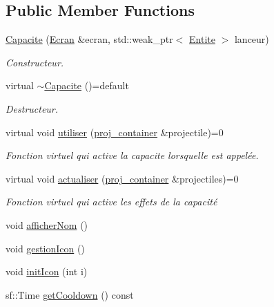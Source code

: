 \subsection*{Public Member Functions}
\begin{DoxyCompactItemize}
\item 
\mbox{\hyperlink{class_capacite_af1279c795ea1d1d157cf3cad846d374e}{Capacite}} (\mbox{\hyperlink{class_ecran}{Ecran}} \&ecran, std\+::weak\+\_\+ptr$<$ \mbox{\hyperlink{class_entite}{Entite}} $>$ lanceur)
\begin{DoxyCompactList}\small\item\em Constructeur. \end{DoxyCompactList}\item 
virtual \mbox{\hyperlink{class_capacite_a43be1570a24a64682ff3f034330779a9}{$\sim$\+Capacite}} ()=default
\begin{DoxyCompactList}\small\item\em Destructeur. \end{DoxyCompactList}\item 
virtual void \mbox{\hyperlink{class_capacite_abac1434e2ac3ecc9e5afdafd9a7a4bed}{utiliser}} (\mbox{\hyperlink{def__type_8h_a87980cd8ee9533e561a73e8bbc728188}{proj\+\_\+container}} \&projectile)=0
\begin{DoxyCompactList}\small\item\em Fonction virtuel qui active la capacite lorsqu\textquotesingle{}elle est appelée. \end{DoxyCompactList}\item 
virtual void \mbox{\hyperlink{class_capacite_a85355aeb1d4acc049ed97da177acbd5f}{actualiser}} (\mbox{\hyperlink{def__type_8h_a87980cd8ee9533e561a73e8bbc728188}{proj\+\_\+container}} \&projectiles)=0
\begin{DoxyCompactList}\small\item\em Fonction virtuel qui active les effets de la capacité \end{DoxyCompactList}\item 
void \mbox{\hyperlink{class_capacite_af2c1a095ea7e7566218a41f2469cd82a}{afficher\+Nom}} ()
\item 
void \mbox{\hyperlink{class_capacite_af50b4c0bf1de8d846c998cba83e1e51f}{gestion\+Icon}} ()
\item 
void \mbox{\hyperlink{class_capacite_aba7e297324570300fe7786dddb8c05ef}{init\+Icon}} (int i)
\item 
sf\+::\+Time \mbox{\hyperlink{class_capacite_aeb57084eeda5d3ac828714fc029d47f9}{get\+Cooldown}} () const

\end{DoxyCompactItemize}
